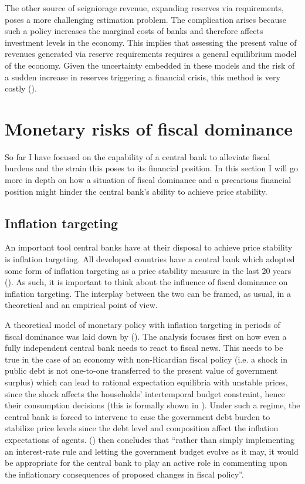 \documentclass[american]{scrartcl}
\newcommand{\citein}[1]{\citeauthor{#1} (\citeyear{#1})}
\begin{document}
The other source of seigniorage revenue, expanding reserves via requirements, poses a more challenging estimation problem. The complication arises because such a policy increases the marginal costs of banks and therefore affects investment levels in the economy. This implies that assessing the present value of revenues generated via reserve requirements requires a general equilibrium model of the economy. Given the uncertainty embedded in these models and the risk of a sudden increase in reserves triggering a financial crisis, this method is very costly (\cite{Hoggarth2002}).

\section{Monetary risks of fiscal dominance}

So far I have focused on the capability of a central bank to alleviate fiscal burdens and the strain this poses to its financial position. In this section I will go more in depth on how a situation of fiscal dominance and a precarious financial position might hinder the central bank's ability to achieve price stability.

\subsection{Inflation targeting}

An important tool central banks have at their disposal to achieve price stability is inflation targeting. All developed countries have a central bank which adopted some form of inflation targeting as a price stability measure in the last 20 years (\cite{Ahmed2021}). As such, it is important to think about the influence of fiscal dominance on inflation targeting. The interplay between the two can be framed, as usual, in a theoretical and an empirical point of view.

A theoretical model of monetary policy with inflation targeting in periods of fiscal dominance was laid down by \citein{Woodford1998}. The analysis focuses first on how even a fully independent central bank needs to react to fiscal news. This needs to be true in the case of an economy with non-Ricardian fiscal policy (i.e. a shock in public debt is not one-to-one transferred to the present value of government surplus) which can lead to rational expectation equilibria with unstable prices, since the shock affects the households' intertemporal budget constraint, hence their consumption decisions (this is formally shown in \cite[p. 123]{Woodford1998}). Under such a regime, the central bank is forced to intervene to ease the government debt burden to stabilize price levels since the debt level and composition affect the inflation expectations of agents. \citein{Woodford1998} then concludes that “rather than simply implementing an interest-rate rule and letting the government budget evolve as it may, it would be appropriate for the central bank to play an active role in commenting upon the inflationary consequences of proposed changes in fiscal policy”.
\end{document}
